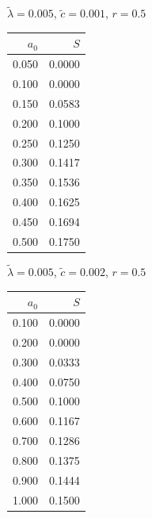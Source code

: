 \documentclass[11pt,a4paper,dvipsnames,twosided]{article}
\begin{document}
\begin{minipage}[t]{\textwidth}
    \begin{minipage}[t]{0.32\textwidth}
        \footnotesize
        \begin{flushleft}$\tilde{\lambda}=0.005$, $\tilde{c}=0.001$, $r=0.5$\end{flushleft}
        \begin{tabular}[t]{rr}
            $a_0$ & $S$ \\
            \hline
             0.050 & 0.0000 \\
             0.100 & 0.0000 \\
             0.150 & 0.0583 \\
             0.200 & 0.1000 \\
             0.250 & 0.1250 \\
             0.300 & 0.1417 \\
             0.350 & 0.1536 \\
             0.400 & 0.1625 \\
             0.450 & 0.1694 \\
             0.500 & 0.1750 \\
        \end{tabular}
    \end{minipage}
    \begin{minipage}[t]{0.32\textwidth}
        \footnotesize
        \begin{flushleft}$\tilde{\lambda}=0.005$, $\tilde{c}=0.002$, $r=0.5$\end{flushleft}
        \begin{tabular}[t]{rr}
            $a_0$ & $S$ \\
            \hline
             0.100 & 0.0000 \\
             0.200 & 0.0000 \\
             0.300 & 0.0333 \\
             0.400 & 0.0750 \\
             0.500 & 0.1000 \\
             0.600 & 0.1167 \\
             0.700 & 0.1286 \\
             0.800 & 0.1375 \\
             0.900 & 0.1444 \\
             1.000 & 0.1500 \\
        \end{tabular}
    \end{minipage}
    \begin{minipage}[t]{0.32\textwidth}

\end{minipage}
\end{minipage}
\end{document}
